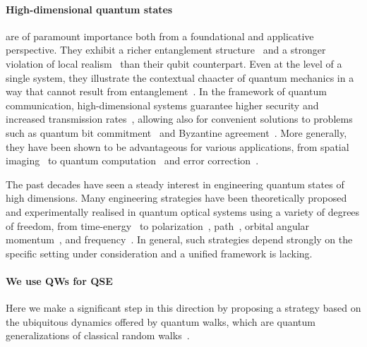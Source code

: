 \paragraph{High-dimensional quantum states}
are of paramount importance both from a foundational and applicative perspective. They exhibit a richer entanglement structure~\cite{horodecki2009quantum} and a stronger violation of local realism~\cite{brunner2014bell} than their qubit counterpart. Even at the level of a single system, they illustrate the contextual chaacter of quantum mechanics in a way that cannot result from entanglement~\cite{lapkiewicz2011experimental}. 
In the framework of quantum communication, high-dimensional systems guarantee higher security and increased transmission rates~\cite{bechmannpasquinucci2000quantum, cerf2002security, bru2002optimal, acin2003security, karimipour2002quantum, durt2004security, nunn2013largealphabet, mower2013highdimensional, lee2014entanglementbased, zhong2015photonefficient}, allowing also for convenient solutions to problems such as quantum bit commitment~\cite{langford2004measuring} and  Byzantine agreement~\cite{fitzi2001quantum}.
More generally, they have been shown to be advantageous for various applications,
from spatial imaging~\cite{howland2013efficient} to quantum computation~\cite{bartlett2002quantum, ralph2007efficient} and error correction~\cite{campbell2012magicstate}.

The past decades have seen a steady interest in engineering quantum states of high dimensions. %
Many engineering strategies have been theoretically proposed and experimentally realised in quantum optical systems using a variety of degrees of freedom, from time-energy~\cite{thew2004belltype, bessire2014versatile} to polarization~\cite{bogdanov2004qutrit}, path~\cite{osullivanhale2005pixel}, orbital angular momentum~\cite{mair2001entanglement, mclaren2012entangled, krenn2013entangled, krenn2014generation, zhang2016engineering}, and frequency~\cite{bernhard2013shaping, jin2016simple}. In general, such strategies depend strongly on the specific setting under consideration and a unified framework is lacking. 

\paragraph{We use QWs for QSE}
Here we make a significant step in this direction by proposing a strategy based on the ubiquitous dynamics offered by quantum walks, which are quantum generalizations of classical random walks~\cite{aharonov1993quantum, nayak2000quantum, ambainis2001onedimensional, kempe2003quantum, venegasandraca2012quantum}.


